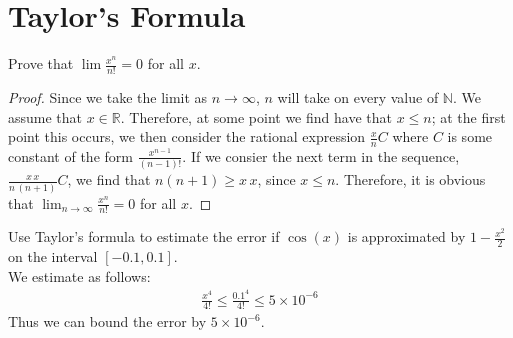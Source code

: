 \documentclass[12pt]{book}
\newcommand{\N}{\mathbb{N}}
\newcommand{\R}{\mathbb{R}}
\newenvironment{exercise}[2][Exercise]{\begin{trivlist}
\item[\hskip \labelsep {\bfseries #1}\hskip \labelsep {\bfseries #2.}]}{\end{trivlist}}
\begin{document}
\section{Taylor's Formula}

\begin{exercise}{6.5.1}
Prove that $\lim \frac{x^n}{n!} = 0$ for all $x$.

\begin{proof}
    Since we take the limit as $n \to \infty$, $n$ will take on every value of $\N$. We assume that $x \in \R$. Therefore, at some point we find have that $x \leq n$; at the first point this occurs, we then consider the rational expression $\frac{x}{n} C$ where $C$ is some constant of the form $\frac{x^{n-1}}{\left(n-1\right)!}$. If we consier the next term in the sequence, $\frac{x\, x}{n\, (n+1)}C$, we find that $n \left(n+1\right)\geq x\,x$, since $x\leq n$. Therefore, it is obvious that $\lim_{n \to \infty} \frac{x^n}{n!}=0$ for all $x$.  
\end{proof}
\end{exercise}



\begin{exercise}{6.5.3}
Use Taylor's formula to estimate the error if $\cos(x)$ is approximated by $1-\frac{x^2}{2}$ on the interval $[-0.1,0.1]$. \\

We estimate as follows:
    \begin{align*}
       \frac{x^4}{4!} \leq \frac{0.1^4}{4!} \leq 5\times10^{-6}
    \end{align*}
    Thus we can bound the error by $5\times10^{-6}$.
\end{exercise}
\end{document}
